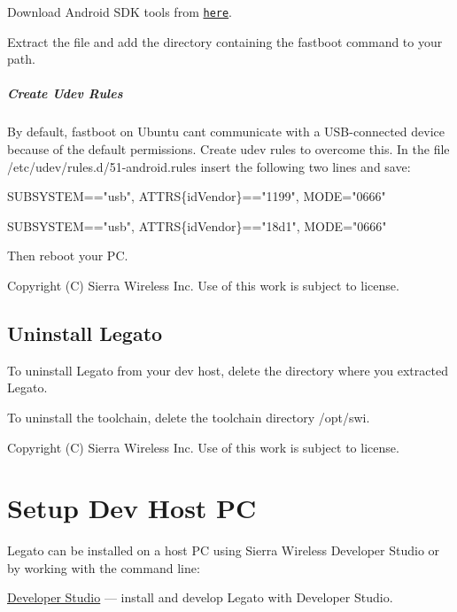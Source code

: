 Download Android S\+D\+K tools from \href{http://developer.android.com/sdk/index.html}{\tt here}.

Extract the file and add the directory containing the fastboot command to your path.\hypertarget{getstarted_linux_android_createDevRules}{}\subparagraph{Create Udev Rules}\label{getstarted_linux_android_createDevRules}
By default, fastboot on Ubuntu can\textquotesingle{}t communicate with a U\+S\+B-\/connected device because of the default permissions. Create udev rules to overcome this. In the file /etc/udev/rules.d/51-\/android.\+rules insert the following two lines and save\+: 
\begin{DoxyCode}
SUBSYSTEM==\textcolor{stringliteral}{"usb"}, ATTRS\{idVendor\}==\textcolor{stringliteral}{"1199"}, MODE=\textcolor{stringliteral}{"0666"} 
\end{DoxyCode}
 
\begin{DoxyCode}
SUBSYSTEM==\textcolor{stringliteral}{"usb"}, ATTRS\{idVendor\}==\textcolor{stringliteral}{"18d1"}, MODE=\textcolor{stringliteral}{"0666"} 
\end{DoxyCode}
 Then reboot your P\+C.





Copyright (C) Sierra Wireless Inc. Use of this work is subject to license. \hypertarget{getstartedUninstall}{}\subsection{Uninstall Legato}\label{getstartedUninstall}
To uninstall Legato from your dev host, delete the directory where you extracted Legato.

To uninstall the toolchain, delete the toolchain directory {\ttfamily /opt/swi}.





Copyright (C) Sierra Wireless Inc. Use of this work is subject to license. \hypertarget{getstartedSetupHost}{}\section{Setup Dev Host P\+C}\label{getstartedSetupHost}
Legato can be installed on a host P\+C using Sierra Wireless\textquotesingle{} Developer Studio or by working with the command line\+:

\hyperlink{getstartedDSinstall}{Developer Studio} --- install and develop Legato with Developer Studio.

